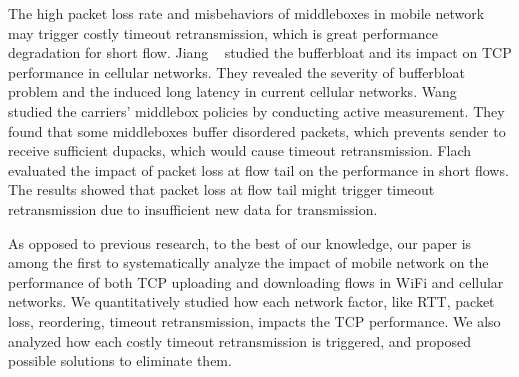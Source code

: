 The high packet loss rate and misbehaviors of middleboxes in mobile network may trigger costly timeout retransmission, which is great performance degradation for short flow. Jiang \etal~\cite{jiang2012tackling} studied the bufferbloat and its impact on TCP performance in cellular networks. They revealed the severity of bufferbloat problem and the induced long latency in current cellular networks. Wang \etal~\cite{Wang:2011:USM:2018436.2018479} studied the carriers' middlebox policies by conducting active measurement. They found that some middleboxes buffer disordered packets, which prevents sender to receive sufficient dupacks, which would cause timeout retransmission. Flach \etal~\cite{flach2013reducing} evaluated the impact of packet loss at flow tail on the performance in short flows. The results showed that packet loss at flow tail might trigger timeout retransmission due to insufficient new data for transmission.

As opposed to previous research, to the best of our knowledge, our paper is among the first to systematically analyze the impact of mobile network on the performance of both TCP uploading and downloading flows in WiFi and cellular networks. We quantitatively studied how each network factor, like RTT, packet loss, reordering, timeout retransmission, impacts the TCP performance. We also analyzed how each costly timeout retransmission is triggered, and proposed possible solutions to eliminate them.